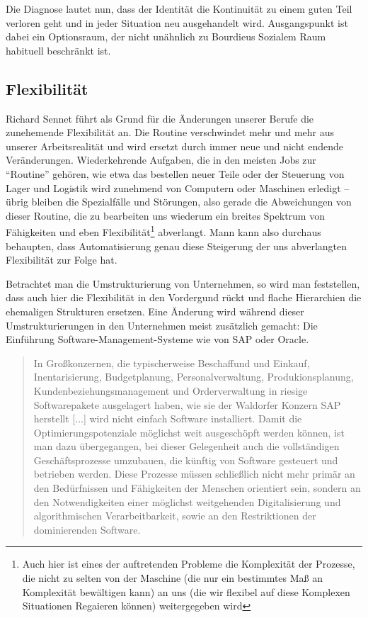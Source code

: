 Die Diagnose lautet nun, dass der Identität die Kontinuität zu einem guten Teil verloren geht und in jeder Situation neu ausgehandelt wird.
Ausgangspunkt ist dabei ein Optionsraum, der nicht unähnlich zu Bourdieus Sozialem Raum habituell beschränkt ist.


\subsection{Flexibilität}

Richard Sennet führt als Grund für die Änderungen unserer Berufe die zunehemende Flexibilität an.
Die Routine verschwindet mehr und mehr aus unserer Arbeitsrealität und wird ersetzt durch immer neue und nicht endende Veränderungen.
Wiederkehrende Aufgaben, die in den meisten Jobs zur \enquote{Routine} gehören, wie etwa das bestellen neuer Teile oder der Steuerung von Lager und Logistik wird zunehmend von Computern oder Maschinen erledigt – übrig bleiben die Spezialfälle und Störungen, also gerade die Abweichungen von dieser Routine, die zu bearbeiten uns wiederum ein breites Spektrum von Fähigkeiten und eben Flexibilität\footnote{Auch hier ist eines der auftretenden Probleme die Komplexität der Prozesse, die nicht zu selten von der Maschine (die nur ein bestimmtes Maß an Komplexität bewältigen kann) an uns (die wir flexibel auf diese Komplexen Situationen Regaieren können) weitergegeben wird} abverlangt.
Mann kann also durchaus behaupten, dass Automatisierung genau diese Steigerung der uns abverlangten Flexibilität zur Folge hat.

Betrachtet man die Umstrukturierung von Unternehmen, so wird man feststellen, dass auch hier die Flexibilität in den Vordergund rückt und flache Hierarchien die ehemaligen Strukturen ersetzen.
Eine Änderung wird während dieser Umstrukturierungen in den Unternehmen meist zusätzlich gemacht: Die Einführung Software-Management-Systeme wie von SAP oder Oracle.

\begin{quote}
	In Großkonzernen, die typischerweise Beschaffund und Einkauf, Inentarisierung, Budgetplanung, Personalverwaltung, Produkionsplanung, Kundenbeziehungsmanagement und Orderverwaltung in riesige Softwarepakete ausgelagert haben, wie sie der Waldorfer Konzern SAP herstellt [...] wird nicht einfach Software installiert. Damit die Optimierungspotenziale möglichst weit ausgeschöpft werden können, ist man dazu übergegangen, bei dieser Gelegenheit auch die vollständigen Geschäftsprozesse umzubauen, die künftig von Software gesteuert und betrieben werden. Diese Prozesse müssen schließlich nicht mehr primär an den Bedürfnissen und Fähigkeiten der Menschen orientiert sein, sondern an den Notwendigkeiten einer möglichst weitgehenden Digitalisierung und algorithmischen Verarbeitbarkeit, sowie an den Restriktionen der dominierenden Software.
	
	\em \cite[172f.]{arbeitsfrei}
\end{quote}

